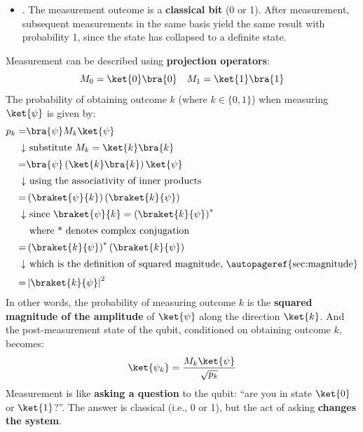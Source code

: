 \begin{itemize}
    
    \item {}. The measurement outcome is a \textbf{classical bit} (0 or 1). After measurement, subsequent measurements in the same basis yield the same result with probability 1, since the state has collapsed to a definite state.
\end{itemize}
Measurement can be described using \textbf{projection operators}:
\begin{equation*}
    M_0 = \ket{0}\bra{0} \quad M_1 = \ket{1}\bra{1}
\end{equation*}
The probability of obtaining outcome $k$ (where $k \in \{0,1\}$) when measuring $\ket{\psi}$ is given by:
\begin{align*}
    p_k =& \bra{\psi} M_k \ket{\psi} \\[.2em]
    \downarrow& \text{ substitute } M_k = \ket{k}\bra{k} \\[.2em]
    =& \bra{\psi} \left(\ket{k}\bra{k}\right) \ket{\psi} \\[.2em]
    \downarrow& \text{ using the associativity of inner products} \\[.2em]
    =& \left(\braket{\psi}{k}\right) \left(\braket{k}{\psi}\right) \\[.2em]
    \downarrow& \text{ since } \braket{\psi}{k} = \left(\braket{k}{\psi}\right)^* \\[.2em]
    & \text{ where * denotes complex conjugation} \\[.2em]
    =& \left(\braket{k}{\psi}\right)^{*} \left(\braket{k}{\psi}\right) \\[.2em]
    \downarrow& \text{ which is the definition of squared magnitude, \autopageref{sec:magnitude}} \\[.2em]
    =& \left|\braket{k}{\psi}\right|^2
\end{align*}
In other words, the probability of measuring outcome $k$ is the \textbf{squared magnitude of the amplitude} of $\ket{\psi}$ along the direction $\ket{k}$. And the post-measurement state of the qubit, conditioned on obtaining outcome $k$, becomes:
\begin{equation*}
    \ket{\psi_k} = \frac{M_k \ket{\psi}}{\sqrt{p_k}}
\end{equation*}
Measurement is like \textbf{asking a question} to the qubit: ``are you in state $\ket{0}$ or $\ket{1}$?''. The answer is classical (i.e., 0 or 1), but the act of asking \textbf{changes the system}.

